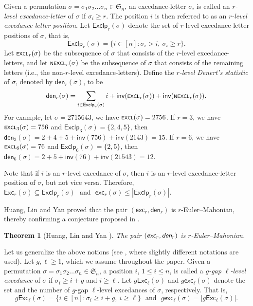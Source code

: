 \documentclass[12pt]{article}
\newtheorem{theorem}{Theorem}[section]
\newtheorem{remark}{Remark}[section]
\begin{document}
Given a permutation  $\sigma=\sigma_{1}\sigma_{2}\ldots \sigma_{n}\in\mathfrak{S}_{n}$, 
an excedance-letter $\sigma_{i}$ is called an \emph{$r$-level excedance-letter} of $\sigma$ if $\sigma_{i}\geq r$.
The position $i$ is then referred to as an \emph{$r$-level excedance-letter position}.
Let $\textsf{Exclp}_{r}(\sigma)$ denote the set of $r$-level excedance-letter positions of $\sigma$, that is,
$$\textsf{Exclp}_{r}(\sigma)=\{i\in[n]:\sigma_{i}>i,~\sigma_{i}\geq r\}.$$
Let $\textsf{\scriptsize{EXCL}}_{r}(\sigma)$ be the subsequence of $\sigma$  that consists of the $r$-level excedance-letters,
and let $\textsf{\scriptsize{NEXCL}}_{r}(\sigma)$ be the subsequence of $\sigma$  that consists of the remaining letters 
(i.e., the non-$r$-level excedance-letters). 
Define the \emph{$r$-level Denert's statistic} of $\sigma$, denoted by $\textsf{den}_{r}(\sigma)$, to be 
$$
	\textsf{den}_{r}(\sigma)=\sum_{i\in\textsf{Exclp}_{r}(\sigma)}i+\textsf{inv}(\textsf{\scriptsize{EXCL}}_{r}(\sigma))+\textsf{inv}(\textsf{\scriptsize{NEXCL}}_{r}(\sigma)).
$$
For example, let $\sigma=2715643$, we have $\textsf{\scriptsize{EXCL}}(\sigma)=2756$.
If $r=3$, we have $\textsf{\scriptsize{EXCL}}_{3}(\sigma)=756$ and $\textsf{Exclp}_{3}(\sigma)=\{2,4,5\}$, then 
$\textsf{den}_{3}(\sigma)=2+4+5+\textsf{inv}(756)+\textsf{inv}(2143)=15.$
If $r=6$, we have $\textsf{\scriptsize{EXCL}}_{6}(\sigma)=76$ and $\textsf{Exclp}_{6}(\sigma)=\{2,5\}$, then 
$\textsf{den}_{6}(\sigma)=2+5+\textsf{inv}(76)+\textsf{inv}(21543)=12.$

Note that if $i$ is an $r$-level excedance of $\sigma$,
then $i$ is an $r$-level excedance-letter position of $\sigma$,
but not vice versa.
Therefore, 
$\textsf{Exc}_{r}(\sigma)\subseteq\textsf{Exclp}_{r}(\sigma)
\text{~~and~~} \textsf{exc}_{r}(\sigma)\leq|\textsf{Exclp}_{r}(\sigma)|.$

Huang, Lin and Yan \cite{Yan-2025} proved that the pair $(\textsf{exc}_{r},\textsf{den}_{r})$ is $r$-Euler--Mahonian,
thereby confirming a conjecture proposed in \cite{Liu-2024}.
\begin{theorem}[Huang, Lin and Yan \cite{Yan-2025}] 
The pair $(\emph{\textsf{exc}}_{r},\emph{\textsf{den}}_{r})$ is $r$-Euler--Mahonian.
\end{theorem}

Let us generalize the above notions (see \cite{Liu-2024}, where slightly different notations are used).
Let $g,\ell\geq1$, which we assume throughout the paper.
Given  a permutation  $\sigma=\sigma_{1}\sigma_{2}\ldots \sigma_{n}\in\mathfrak{S}_{n}$,
a position $i$, $1\leq i\leq n$, is called a  \emph{$g$-gap $\ell$-level excedance} of $\sigma$ if $\sigma_{i}\geq i+g$ and $i\geq \ell$.
Let $g\textsf{Exc}_{\ell}(\sigma)$ and $g\textsf{exc}_{\ell}(\sigma)$ denote  the set and the number of $g$-gap $\ell$-level excedances of $\sigma$, respectively.
That is,
\vspace{-8pt}
$$g\textsf{Exc}_{\ell}(\sigma)=\{i\in[n]:\sigma_{i}\geq i+g ,~i\geq \ell\}
\text{~~and~~}g\textsf{exc}_{\ell}(\sigma)=|g\textsf{Exc}_{\ell}(\sigma)|.$$
\end{document}
